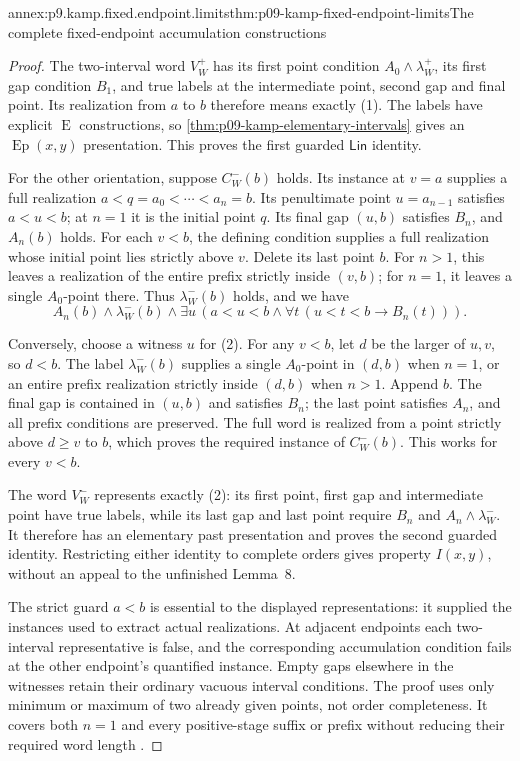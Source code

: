 \begin{annexitem}{annex:p9.kamp.fixed.endpoint.limits}{thm:p09-kamp-fixed-endpoint-limits}{The complete fixed-endpoint accumulation constructions}
\begin{proof}
The two-interval word \(V_W^+\) has its first point condition
\(A_0\land\lambda_W^+\), its first gap condition \(B_1\),
and true labels at the intermediate point, second gap and final
point. Its realization from \(a\) to \(b\) therefore means
exactly (1). The labels have explicit \(\operatorname{E}\)
constructions, so \cref{thm:p09-kamp-elementary-intervals}
gives an \(\operatorname{Ep}(x,y)\) presentation. This
proves the first guarded \(\mathsf{Lin}\) identity.

For the other orientation, suppose \(C_W^-(b)\) holds.
Its instance at \(v=a\) supplies a full realization
\(a<q=a_0<\cdots<a_n=b\).
Its penultimate point \(u=a_{n-1}\) satisfies \(a<u<b\);
at \(n=1\) it is the initial point \(q\). Its final
gap \((u,b)\) satisfies \(B_n\), and \(A_n(b)\) holds.
For each \(v<b\), the defining condition supplies a full
realization whose initial point lies strictly above \(v\).
Delete its last point \(b\). For \(n>1\), this leaves
a realization of the entire prefix strictly inside \((v,b)\);
for \(n=1\), it leaves a single \(A_0\)-point there.
Thus \(\lambda_W^-(b)\) holds, and we have
\[
 A_n(b)\land\lambda_W^-(b)\land
       \exists u\,(a<u<b\land\forall t\,(u<t<b\to B_n(t))).
 \tag{2}
\]

Conversely, choose a witness \(u\) for (2). For any \(v<b\),
let \(d\) be the larger of \(u,v\), so \(d<b\).
The label \(\lambda_W^-(b)\) supplies a single
\(A_0\)-point in \((d,b)\) when \(n=1\), or an
entire prefix realization strictly inside \((d,b)\) when
\(n>1\). Append \(b\). The final gap is contained in
\((u,b)\) and satisfies \(B_n\); the last point satisfies
\(A_n\), and all prefix conditions are preserved. The full
word is realized from a point strictly above \(d\geq v\)
to \(b\), which proves the required instance of
\(C_W^-(b)\). This works for every \(v<b\).

The word \(V_W^-\) represents exactly (2): its first point,
first gap and intermediate point have true labels, while its
last gap and last point require \(B_n\) and
\(A_n\land\lambda_W^-\). It therefore has an elementary
past presentation and proves the second guarded identity.
Restricting either identity to complete orders gives property
\(I(x,y)\), without an appeal to the unfinished Lemma~8.

The strict guard \(a<b\) is essential to the displayed
representations: it supplied the instances used to extract actual
realizations. At adjacent endpoints each two-interval representative
is false, and the corresponding accumulation condition fails at
the other endpoint's quantified instance. Empty gaps elsewhere in
the witnesses retain their ordinary vacuous interval conditions.
The proof uses only minimum or maximum of two already given points,
not order completeness. It covers both \(n=1\) and every
positive-stage suffix or prefix without reducing their required
word length \cite[ch.~III, pp.~89--90]{Kamp1968}.
\end{proof}
\end{annexitem}

